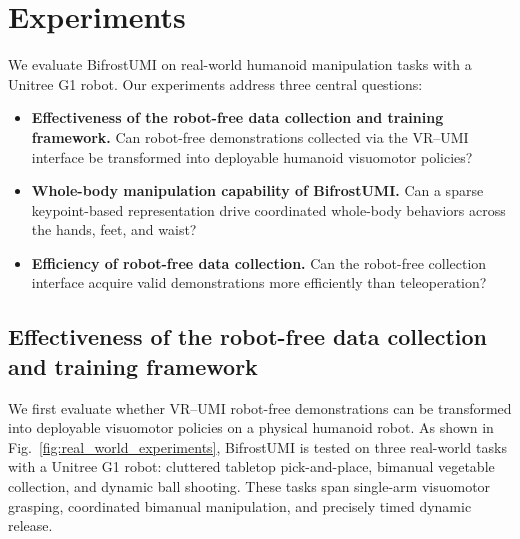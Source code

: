 \documentclass[letterpaper, 10 pt, conference]{ieeeconf}  %
\begin{document}


\section{Experiments}
\label{sec:experiments}


%
We evaluate BifrostUMI on real-world humanoid manipulation tasks with a Unitree G1 robot. Our experiments address three central questions:

\begin{itemize}
\item \textbf{Effectiveness of the robot-free data collection and training framework.} Can robot-free demonstrations collected via the VR--UMI interface be transformed into deployable humanoid visuomotor policies?
\item \textbf{Whole-body manipulation capability of BifrostUMI.} Can a sparse keypoint-based representation drive coordinated whole-body behaviors across the hands, feet, and waist?
\item \textbf{Efficiency of robot-free data collection.} Can the robot-free collection interface acquire valid demonstrations more efficiently than teleoperation?

\end{itemize}


\subsection{Effectiveness of the robot-free data collection and training framework}

We first evaluate whether VR--UMI robot-free demonstrations can be transformed into deployable visuomotor policies on a physical humanoid robot. As shown in Fig.~\ref{fig:real_world_experiments}, BifrostUMI is tested on three real-world tasks with a Unitree G1 robot: cluttered tabletop pick-and-place, bimanual vegetable collection, and dynamic ball shooting. These tasks span single-arm visuomotor grasping, coordinated bimanual manipulation, and precisely timed dynamic release.
\end{document}
